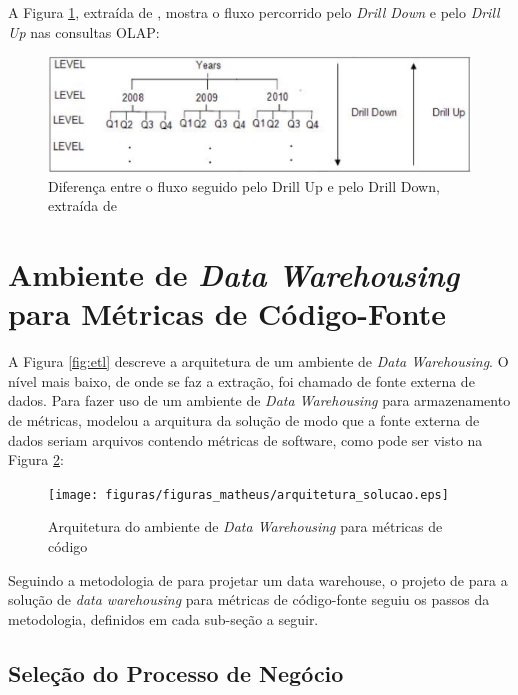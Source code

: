 A Figura \ref{fig:drill}, extraída de , mostra o fluxo percorrido pelo \textit{Drill Down} e pelo \textit{Drill Up} nas consultas OLAP:

\begin{figure}[h!]
\centering
\includegraphics[keepaspectratio=false,scale=0.70]{figuras/figuras_matheus/drill.eps}
\caption{Diferença entre o fluxo seguido pelo Drill Up e pelo Drill Down, extraída de \cite{neeraj_sharma_2011}}
\label{fig:drill}
\end{figure}
\FloatBarrier

\section{Ambiente de \textit{Data Warehousing} para Métricas de Código-Fonte}

A Figura \ref{fig:etl} descreve a arquitetura de um ambiente de \textit{Data Warehousing}. O nível mais baixo, de onde se faz a extração, foi chamado de fonte externa de dados. Para fazer uso de um ambiente de \textit{Data Warehousing} para armazenamento de métricas,  modelou a arquitura da solução de modo que a fonte externa de dados seriam arquivos contendo métricas de software, como pode ser visto na Figura \ref{fig:arquitetura_solucao}:

\begin{figure}[h!]
\centering
\texttt{[image: figuras/figuras\_matheus/arquitetura\_solucao.eps]}
\caption{Arquitetura do ambiente de \textit{Data Warehousing} para métricas de código}
\label{fig:arquitetura_solucao}
\end{figure}
\FloatBarrier

Seguindo a metodologia de  para projetar um data warehouse,  o projeto de  para a solução de \textit{data warehousing} para métricas de código-fonte seguiu os passos da metodologia, definidos em cada sub-seção a seguir.

\subsection{Seleção do Processo de Negócio}

